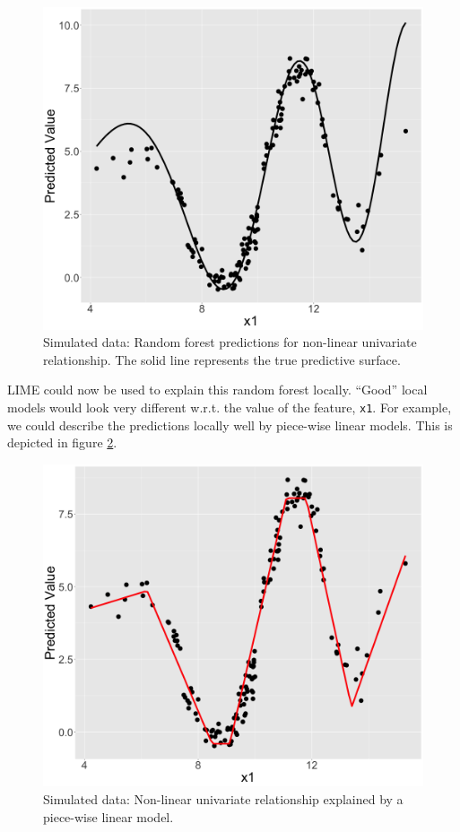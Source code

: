 \documentclass[]{krantz}
\begin{document}
\begin{figure}

{\centering \includegraphics[width=0.99\linewidth]{images/04-09-03} 

}

\caption{Simulated data: Random forest predictions for non-linear univariate relationship. The solid line represents the true predictive surface.}\label{fig:lime-fig3}
\end{figure}

LIME could now be used to explain this random forest locally. ``Good''
local models would look very different w.r.t. the value of the feature,
\texttt{x1}. For example, we could describe the predictions locally well
by piece-wise linear models. This is depicted in figure
\ref{fig:lime-fig4}.

\begin{figure}

{\centering \includegraphics[width=0.99\linewidth]{images/04-09-04} 

}

\caption{Simulated data: Non-linear univariate relationship explained by a piece-wise linear model.}\label{fig:lime-fig4}
\end{figure}
\end{document}

